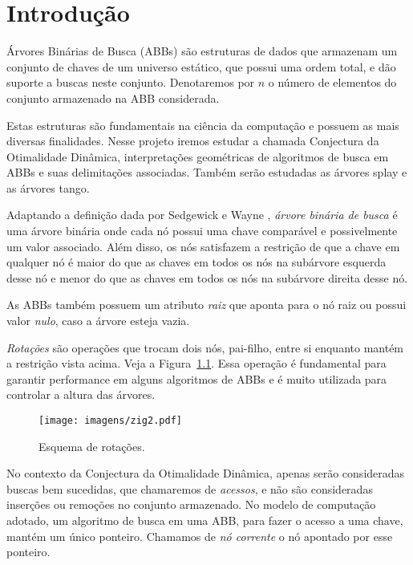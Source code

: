 
\chapter{Introdução}
\label{cap:introducao}

Árvores Binárias de Busca (ABBs) são estruturas de dados que armazenam um conjunto de chaves de um universo estático, que possui uma ordem total, e dão suporte a buscas neste conjunto. Denotaremos por $n$ o número de elementos do conjunto armazenado na ABB considerada.

Estas estruturas são fundamentais na ciência da computação e possuem as mais diversas finalidades. Nesse projeto iremos estudar a chamada Conjectura da Otimalidade Dinâmica, interpretações geométricas de algoritmos de busca em ABBs e suas delimitações associadas. Também serão estudadas as árvores splay e as árvores tango.

Adaptando a definição dada por Sedgewick e Wayne \cite{Sedgewick}, \textit{árvore binária de busca} é uma árvore binária onde cada nó possui uma chave comparável e possivelmente um valor associado. Além disso, os nós satisfazem a restrição de que a chave em qualquer nó é maior do que as chaves em todos os nós na subárvore esquerda desse nó e menor do que as chaves em todos os nós na subárvore direita desse nó.

As ABBs também possuem um atributo \textit{raiz} que aponta para o nó raiz ou possui valor \textit{nulo}, caso a árvore esteja vazia.

\textit{Rotações} são operações que trocam dois nós, pai-filho, entre si enquanto mantém a restrição vista acima. Veja a Figura~\ref{fig:imagem}. Essa operação é fundamental para garantir performance em alguns algoritmos de ABBs e é muito utilizada para controlar a altura das árvores.


\begin{figure}[h]
    \centering
    \texttt{[image: imagens/zig2.pdf]}
    \caption{Esquema de rotações.}
    \label{fig:imagem}
\end{figure}

No contexto da Conjectura da Otimalidade Dinâmica, apenas serão consideradas buscas bem sucedidas, que chamaremos de \textit{acessos}, e não são consideradas inserções ou remoções no conjunto armazenado. No modelo de computação adotado, um algoritmo de busca em uma ABB, para fazer o acesso a uma chave, mantém um único ponteiro. Chamamos de \textit{nó corrente} o nó apontado por esse ponteiro. 


